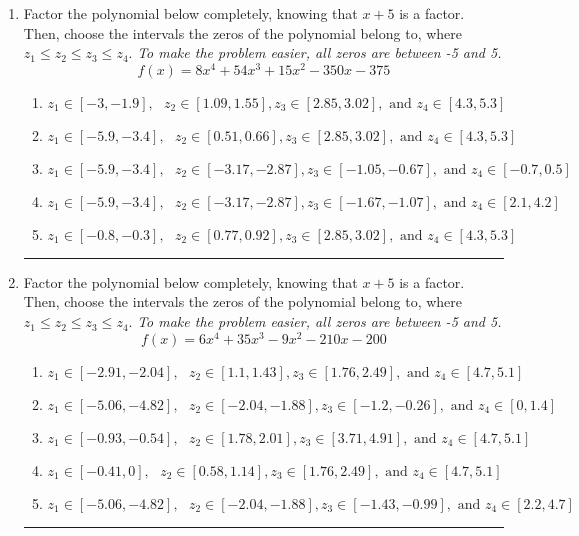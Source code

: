 \documentclass[14pt]{extbook}
\newcommand{\litem}[1]{\item#1\hspace*{-1cm}\rule{\textwidth}{0.4pt}}
\begin{document}
\begin{enumerate}
{\begin{enumerate}[label=\Alph*.]
\end{enumerate} }
\litem{
Factor the polynomial below completely, knowing that $x+5$ is a factor. Then, choose the intervals the zeros of the polynomial belong to, where $z_1 \leq z_2 \leq z_3 \leq z_4$. \textit{To make the problem easier, all zeros are between -5 and 5.}\[ f(x) = 8x^{4} +54 x^{3} +15 x^{2} -350 x -375 \]\begin{enumerate}[label=\Alph*.]
\item \( z_1 \in [-3, -1.9], \text{   }  z_2 \in [1.09, 1.55], z_3 \in [2.85, 3.02], \text{   and   } z_4 \in [4.3, 5.3] \)
\item \( z_1 \in [-5.9, -3.4], \text{   }  z_2 \in [0.51, 0.66], z_3 \in [2.85, 3.02], \text{   and   } z_4 \in [4.3, 5.3] \)
\item \( z_1 \in [-5.9, -3.4], \text{   }  z_2 \in [-3.17, -2.87], z_3 \in [-1.05, -0.67], \text{   and   } z_4 \in [-0.7, 0.5] \)
\item \( z_1 \in [-5.9, -3.4], \text{   }  z_2 \in [-3.17, -2.87], z_3 \in [-1.67, -1.07], \text{   and   } z_4 \in [2.1, 4.2] \)
\item \( z_1 \in [-0.8, -0.3], \text{   }  z_2 \in [0.77, 0.92], z_3 \in [2.85, 3.02], \text{   and   } z_4 \in [4.3, 5.3] \)

\end{enumerate} }
\litem{
Factor the polynomial below completely, knowing that $x+5$ is a factor. Then, choose the intervals the zeros of the polynomial belong to, where $z_1 \leq z_2 \leq z_3 \leq z_4$. \textit{To make the problem easier, all zeros are between -5 and 5.}\[ f(x) = 6x^{4} +35 x^{3} -9 x^{2} -210 x -200 \]\begin{enumerate}[label=\Alph*.]
\item \( z_1 \in [-2.91, -2.04], \text{   }  z_2 \in [1.1, 1.43], z_3 \in [1.76, 2.49], \text{   and   } z_4 \in [4.7, 5.1] \)
\item \( z_1 \in [-5.06, -4.82], \text{   }  z_2 \in [-2.04, -1.88], z_3 \in [-1.2, -0.26], \text{   and   } z_4 \in [0, 1.4] \)
\item \( z_1 \in [-0.93, -0.54], \text{   }  z_2 \in [1.78, 2.01], z_3 \in [3.71, 4.91], \text{   and   } z_4 \in [4.7, 5.1] \)
\item \( z_1 \in [-0.41, 0], \text{   }  z_2 \in [0.58, 1.14], z_3 \in [1.76, 2.49], \text{   and   } z_4 \in [4.7, 5.1] \)
\item \( z_1 \in [-5.06, -4.82], \text{   }  z_2 \in [-2.04, -1.88], z_3 \in [-1.43, -0.99], \text{   and   } z_4 \in [2.2, 4.7] \)


\end{enumerate}}
\end{enumerate}
\end{document}
